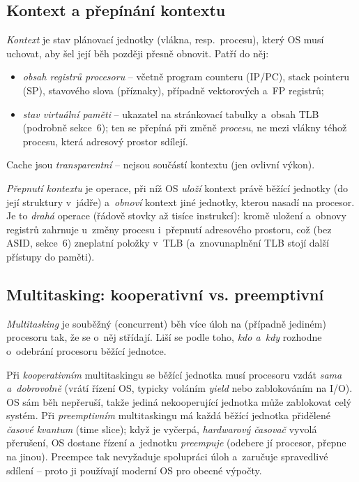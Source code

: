 \subsection{Kontext a přepínání kontextu}

\begin{definice}
\emph{Kontext} je stav plánovací jednotky (vlákna, resp.\ procesu), který OS musí uchovat, aby šel její běh později přesně obnovit. Patří do něj:
\begin{itemize}
\item \emph{obsah registrů procesoru} -- včetně program counteru (IP/PC), stack pointeru (SP), stavového slova (příznaky), případně vektorových a~FP registrů;
\item \emph{stav virtuální paměti} -- ukazatel na stránkovací tabulky a~obsah TLB (podrobně sekce~6); ten se přepíná při změně \emph{procesu}, ne mezi vlákny téhož procesu, která adresový prostor sdílejí.
\end{itemize}
Cache jsou \emph{transparentní} -- nejsou součástí kontextu (jen ovlivní výkon).
\end{definice}

\begin{definice}
\emph{Přepnutí kontextu} je operace, při níž OS \emph{uloží} kontext právě běžící jednotky (do její struktury v~jádře) a~\emph{obnoví} kontext jiné jednotky, kterou nasadí na procesor. Je to \emph{drahá} operace (řádově stovky až tisíce instrukcí): kromě uložení a~obnovy registrů zahrnuje u~změny procesu i~přepnutí adresového prostoru, což (bez ASID, sekce~6) zneplatní položky v~TLB (a~znovunaplnění TLB stojí další přístupy do paměti).
\end{definice}

\subsection{Multitasking: kooperativní vs. preemptivní}

\emph{Multitasking} je souběžný (concurrent) běh více úloh na (případně jediném) procesoru tak, že se o~něj střídají. Liší se podle toho, \emph{kdo a~kdy} rozhodne o~odebrání procesoru běžící jednotce.

\begin{definice}
Při \emph{kooperativním} multitaskingu se běžící jednotka musí procesoru vzdát \emph{sama a~dobrovolně} (vrátí řízení OS, typicky voláním \emph{yield} nebo zablokováním na I/O). OS sám běh nepřeruší, takže jediná nekooperující jednotka může zablokovat celý systém. Při \emph{preemptivním} multitaskingu má každá běžící jednotka přidělené \emph{časové kvantum} (time slice); když je vyčerpá, \emph{hardwarový časovač} vyvolá přerušení, OS dostane řízení a~jednotku \emph{preempuje} (odebere jí procesor, přepne na jinou). Preempce tak nevyžaduje spolupráci úloh a~zaručuje spravedlivé sdílení -- proto ji používají moderní OS pro obecné výpočty.
\end{definice}

